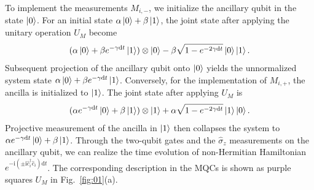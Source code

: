 \documentclass[longbibliography, aps, prx, amsmath, amssymb, amsfonts, twocolumn,superscriptaddress, footinbib]{revtex4-1}
\begin{document}
	To implement the measurements $M_{i,-}$, we initialize the ancillary qubit in the state $\ket{0}$. For an initial state $\alpha \ket{0} + \beta \ket{1}$, the joint state after applying the unitary operation $U_M$ become
	\begin{equation}
		(\alpha \ket{0} + \beta e^{-\gamma \mathrm{d}t} \ket{1}) \otimes \ket{0} - \beta \sqrt{1-e^{-2\gamma\mathrm{d}t}} \ket{0} \ket{1}.
	\end{equation}
	Subsequent projection of the ancillary qubit onto $\ket{0}$ yields the unnormalized system state $\alpha \ket{0} + \beta e^{-\gamma \mathrm{d}t} \ket{1}$. 
	Conversely, for the implementation of $M_{i,+}$, the ancilla is initialized to $\ket{1}$. The joint state after applying $U_M$ is
	\begin{equation}
		(\alpha e^{-\gamma \mathrm{d}t} \ket{0} + \beta  \ket{1}) \otimes \ket{1} + \alpha \sqrt{1-e^{-2\gamma\mathrm{d}t}} \ket{1} \ket{0}.
	\end{equation}
	Projective measurement of the ancilla in $\ket{1}$ then collapses the system to $\alpha e^{-\gamma \mathrm{d}t} \ket{0} + \beta  \ket{1}$.
	Through the two-qubit gates and the $\hat{\sigma}_z$ measurements on the ancillary qubit, we can realize the time evolution  of non-Hermitian Hamiltonian $e^{-\mathrm{i} (\pm \mathrm{i} \hat{c}_i^{\dagger}\hat{c}_i) \mathrm{d}t}$.
	The corresponding description in the MQCs is shown as purple squares $U_{M}$ in Fig.~\ref{fig:01}(a).
\end{document}
